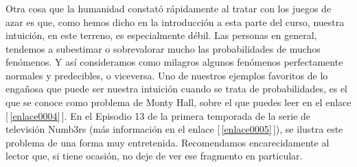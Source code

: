 \subsubsection*{}
Otra cosa que la humanidad constató rápidamente al tratar con los juegos de azar es que, como hemos
dicho en la introducción a esta parte del curso, nuestra intuición, en este terreno, es
especialmente débil. Las personas en general, tendemos a subestimar o sobrevalorar mucho las
probabilidades de muchos fenómenos. Y así consideramos como milagros algunos fenómenos
perfectamente normales y predecibles, o viceversa. Uno de nuestros ejemplos favoritos de lo
engañosa que puede ser nuestra intuición cuando se trata de probabilidades, es el que se conoce
como {\sf problema de Monty Hall},
sobre el que puedes leer en el enlace [\,\ref{enlace0004}\,]\label{enlace0004a}.
En el Episodio 13 de la primera temporada de la serie de televisión Numb3rs (más información en el
enlace [\,\ref{enlace0005}\label{enlace0005a}\,]),  se ilustra
este problema de una forma muy entretenida. Recomendamos encarecidamente al lector que, si tiene
ocasión, no deje de ver ese fragmento en particular.
%

